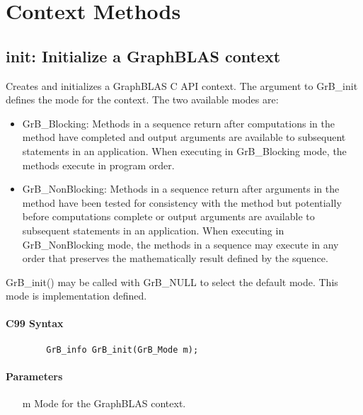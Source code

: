 \section{Context Methods}

\subsection{{\sf init}: Initialize a GraphBLAS context}

Creates and initializes a GraphBLAS C API context.  The argument
to {\sf GrB\_init} defines the mode for the context.  The two
available modes are:

\begin{itemize}
\item {\sf GrB\_Blocking}: Methods in a sequence return after
computations in the method have completed and output arguments
are available to subsequent statements in an application.  When
executing in {\sf GrB\_Blocking} mode, the methods execute 
in program order.

\item {\sf GrB\_NonBlocking}: Methods in a sequence return after
arguments in the method have been tested for consistency with the
method but potentially before computations complete or output 
arguments are available to subsequent statements in an application.
When executing in {\sf GrB\_NonBlocking} mode, the methods 
in a sequence may execute in any order that preserves the 
mathematically result defined by the squence.

\end{itemize}

{\sf GrB\_init()} may be called with {\sf GrB\_NULL} to select 
the default mode.  This mode is implementation defined.

\paragraph{C99 Syntax}

\begin{verbatim}
        GrB_info GrB_init(GrB_Mode m);
\end{verbatim}


\paragraph{Parameters}

\begin{itemize}[leftmargin=1.1in]
	\item[{\sf m}] Mode for the GraphBLAS context.
\end{itemize}

